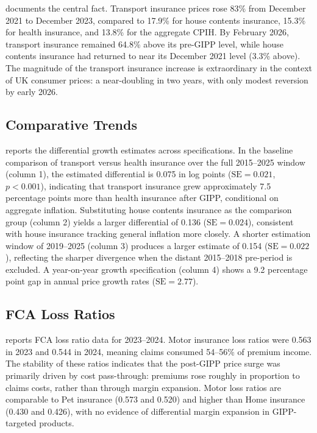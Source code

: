 \documentclass[12pt]{article}
\begin{document}
 documents the central fact. Transport insurance prices rose 83\% from December 2021 to December 2023, compared to 17.9\% for house contents insurance, 15.3\% for health insurance, and 13.8\% for the aggregate CPIH. By February 2026, transport insurance remained 64.8\% above its pre-GIPP level, while house contents insurance had returned to near its December 2021 level (3.3\% above). The magnitude of the transport insurance increase is extraordinary in the context of UK consumer prices: a near-doubling in two years, with only modest reversion by early 2026.

\subsection{Comparative Trends}

 reports the differential growth estimates across specifications. In the baseline comparison of transport versus health insurance over the full 2015--2025 window (column 1), the estimated differential is 0.075 in log points ($\text{SE} = 0.021$, $p < 0.001$), indicating that transport insurance grew approximately 7.5 percentage points more than health insurance after GIPP, conditional on aggregate inflation. Substituting house contents insurance as the comparison group (column 2) yields a larger differential of 0.136 ($\text{SE} = 0.024$), consistent with house insurance tracking general inflation more closely. A shorter estimation window of 2019--2025 (column 3) produces a larger estimate of 0.154 ($\text{SE} = 0.022$), reflecting the sharper divergence when the distant 2015--2018 pre-period is excluded. A year-on-year growth specification (column 4) shows a 9.2 percentage point gap in annual price growth rates ($\text{SE} = 2.77$).



\subsection{FCA Loss Ratios}

 reports FCA loss ratio data for 2023--2024. Motor insurance loss ratios were 0.563 in 2023 and 0.544 in 2024, meaning claims consumed 54--56\% of premium income. The stability of these ratios indicates that the post-GIPP price surge was primarily driven by cost pass-through: premiums rose roughly in proportion to claims costs, rather than through margin expansion. Motor loss ratios are comparable to Pet insurance (0.573 and 0.520) and higher than Home insurance (0.430 and 0.426), with no evidence of differential margin expansion in GIPP-targeted products.
\end{document}
